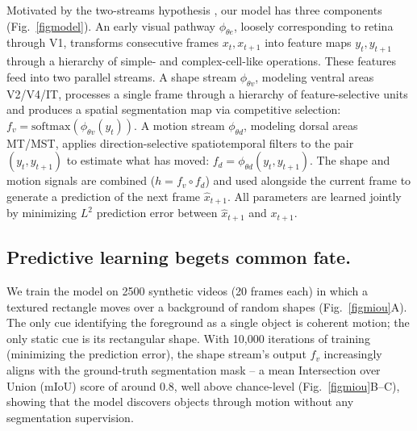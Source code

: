 \documentclass{ccn}  %
\newcommand{\TS}[1]{\textcolor{magenta}{[TS: #1]}}
\begin{document}
Motivated by the two-streams hypothesis \citep{goodale1992separate}, our model has three components (Fig.~\ref{figmodel}). An early visual pathway $\phi_{\theta e}$, loosely corresponding to retina through V1, transforms consecutive frames $x_t, x_{t+1}$ into feature maps $y_t, y_{t+1}$ through a hierarchy of simple- and complex-cell-like operations. These features feed into two parallel streams. A shape stream $\phi_{\theta v}$, modeling ventral areas V2/V4/IT, processes a single frame through a hierarchy of feature-selective units and produces a spatial segmentation map via competitive selection: $f_v = \mathrm{softmax}(\phi_{\theta v}(y_t))$. A motion stream $\phi_{\theta d}$, modeling dorsal areas MT/MST, applies direction-selective spatiotemporal filters to the pair $(y_t, y_{t+1})$ to estimate what has moved: $f_d = \phi_{\theta d}(y_t, y_{t+1})$. The shape and motion signals are combined ($h = f_v \circ f_d$) and used alongside the current frame to generate a prediction of the next frame $\hat{x}_{t+1}$. All parameters are learned jointly by minimizing $L^2$ prediction error between $\hat{x}_{t+1}$ and $x_{t+1}$.








\subsection*{Predictive learning begets common fate.}

We train the model on 2500 synthetic videos (20 frames each) in which a textured rectangle moves over a background of random shapes (Fig.~\ref{figmiou}A). The only cue identifying the foreground as a single object is coherent motion; the only static cue is its rectangular shape. With 10,000 iterations of training (minimizing the prediction error), the shape stream's output $f_v$ increasingly aligns with the ground-truth segmentation mask -- a mean Intersection over Union (mIoU) score of around 0.8, well above chance-level (Fig.~\ref{figmiou}B--C), showing that the model discovers objects through motion without any segmentation supervision.
\end{document}
